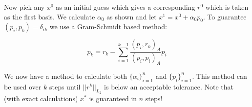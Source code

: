 \documentclass[a4paper, 12pt]{article}
\begin{document}
\noindent
Now pick any $x^0$ as an initial guess which gives 
a corresponding $r^0$ which is taken as the first basis.
We calculate $\alpha_0$ as shown and let $x^1=x^0+\alpha_0 p_0$.
To guarantee $(p_i,p_k)=\delta_{ik}$ we use a 
Gram-Schmidt based method:

\begin{equation}
p_k = r_k - \sum_{i=1}^{k-1} \frac{ (p_i,r_k)_A}{ (p_i,p_i)_A} p_i
\end{equation}

\noindent
We now have a method to calculate both $\{\alpha_i\}_{i=1}^n$ 
and  $\{p_i\}_{i=1}^n$.
This method  can be used over $k$ steps until $||r^k||_{L_2}$
is below an acceptable tolerance. 
Note that (with exact calculations) $x^*$ is guaranteed in $n$ steps!
\end{document}
